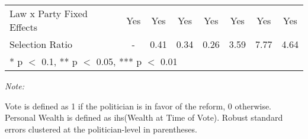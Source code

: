 \begin{table}[!h]
{\begin{threeparttable}
\begin{tabular}[t]{lccccccc}
Law x Party Fixed Effects & Yes & Yes & Yes & Yes & Yes & Yes & Yes\\
Selection Ratio & - & 0.41 & 0.34 & 0.26 & 3.59 & 7.77 & 4.64\\
\bottomrule
\multicolumn{8}{l}{\rule{0pt}{1em}* p $<$ 0.1, ** p $<$ 0.05, *** p $<$ 0.01}\\
\end{tabular}
\begin{tablenotes}[para]
\item \textit{Note:} 
\item Vote is defined as 1 if the politician is in favor of the reform, 0 otherwise. Personal Wealth is defined as ihs(Wealth at Time of Vote). Robust standard errors clustered at the politician-level in parentheses.
\end{tablenotes}
\end{threeparttable}}
\end{table}
